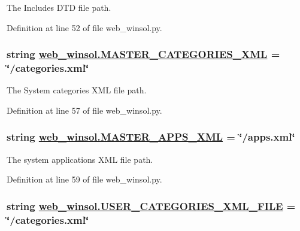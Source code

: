 The Includes DTD file path. 



Definition at line 52 of file web\_\-winsol.py.\hypertarget{namespaceweb__winsol_72297e3ebe0d8bb41b3b8e534fa2077f}{
\subsubsection[MASTER\_\-CATEGORIES\_\-XML]{\setlength{\rightskip}{0pt plus 5cm}string \hyperlink{namespaceweb__winsol_72297e3ebe0d8bb41b3b8e534fa2077f}{web\_\-winsol.MASTER\_\-CATEGORIES\_\-XML} = \char`\"{}/categories.xml\char`\"{}}}
\label{namespaceweb__winsol_72297e3ebe0d8bb41b3b8e534fa2077f}


The System categories XML file path. 



Definition at line 57 of file web\_\-winsol.py.\hypertarget{namespaceweb__winsol_5e9abe539d73e85151a06da686d011fd}{
\subsubsection[MASTER\_\-APPS\_\-XML]{\setlength{\rightskip}{0pt plus 5cm}string \hyperlink{namespaceweb__winsol_5e9abe539d73e85151a06da686d011fd}{web\_\-winsol.MASTER\_\-APPS\_\-XML} = \char`\"{}/apps.xml\char`\"{}}}
\label{namespaceweb__winsol_5e9abe539d73e85151a06da686d011fd}


The system applications XML file path. 



Definition at line 59 of file web\_\-winsol.py.\hypertarget{namespaceweb__winsol_f819cf1d0612321433c03f21507d9b18}{
\subsubsection[USER\_\-CATEGORIES\_\-XML\_\-FILE]{\setlength{\rightskip}{0pt plus 5cm}string \hyperlink{namespaceweb__winsol_f819cf1d0612321433c03f21507d9b18}{web\_\-winsol.USER\_\-CATEGORIES\_\-XML\_\-FILE} = \char`\"{}/categories.xml\char`\"{}}}
\label{namespaceweb__winsol_f819cf1d0612321433c03f21507d9b18}



